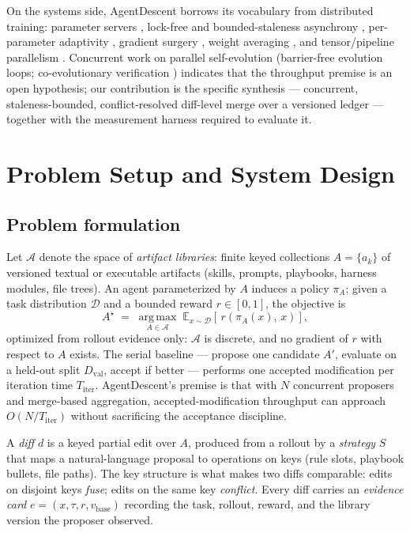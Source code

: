 \documentclass{article}
\newcommand{\Dval}{D_{\mathrm{val}}}
\begin{document}
On the systems side, AgentDescent borrows its vocabulary from distributed training: parameter servers \citep{li2014parameterserver}, lock-free and bounded-staleness asynchrony \citep{niu2011hogwild,fu2025areal,roll2025flash}, per-parameter adaptivity \citep{kingma2014adam}, gradient surgery \citep{yu2020pcgrad}, weight averaging \citep{wortsman2022modelsoups}, and tensor/pipeline parallelism \citep{shoeybi2019megatron,huang2019gpipe}. Concurrent work on parallel self-evolution (barrier-free evolution loops; co-evolutionary verification \citep{coevoskills2026}) indicates that the throughput premise is an open hypothesis; our contribution is the specific synthesis --- concurrent, staleness-bounded, conflict-resolved diff-level merge over a versioned ledger --- together with the measurement harness required to evaluate it.

\section{Problem Setup and System Design}
\label{sec:design}

\subsection{Problem formulation}
\label{sec:setup}
Let $\mathcal{A}$ denote the space of \emph{artifact libraries}: finite keyed collections $A = \{a_k\}$ of versioned textual or executable artifacts (skills, prompts, playbooks, harness modules, file trees). An agent parameterized by $A$ induces a policy $\pi_A$; given a task distribution $\mathcal{D}$ and a bounded reward $r \in [0,1]$, the objective is
\begin{equation}
\label{eq:objective}
A^\star \;=\; \operatorname*{arg\,max}_{A \in \mathcal{A}} \; \mathbb{E}_{x \sim \mathcal{D}}\!\left[\, r\!\left(\pi_A(x),\, x\right) \right],
\end{equation}
optimized from rollout evidence only: $\mathcal{A}$ is discrete, and no gradient of $r$ with respect to $A$ exists. The serial baseline --- propose one candidate $A'$, evaluate on a held-out split $\Dval$, accept if better --- performs one accepted modification per iteration time $T_{\mathrm{iter}}$. AgentDescent's premise is that with $N$ concurrent proposers and merge-based aggregation, accepted-modification throughput can approach $O(N/T_{\mathrm{iter}})$ without sacrificing the acceptance discipline.

A \emph{diff} $d$ is a keyed partial edit over $A$, produced from a rollout by a \emph{strategy} $S$ that maps a natural-language proposal to operations on keys (rule slots, playbook bullets, file paths). The key structure is what makes two diffs comparable: edits on disjoint keys \emph{fuse}; edits on the same key \emph{conflict}. Every diff carries an \emph{evidence card} $e = (x, \tau, r, v_{\mathrm{base}})$ recording the task, rollout, reward, and the library version the proposer observed.
\end{document}
